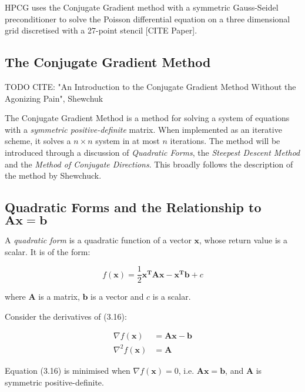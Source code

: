 HPCG uses the Conjugate Gradient method with a symmetric Gauss-Seidel preconditioner to solve the Poisson differential equation on a three dimensional grid discretised with a 27-point stencil [CITE Paper].


%
%
\subsection{The Conjugate Gradient Method}

TODO CITE: "An Introduction to the Conjugate Gradient Method Without the Agonizing Pain", Shewchuk

The Conjugate Gradient Method is a method for solving a system of equations with a \emph{symmetric positive-definite} matrix. When implemented as an iterative scheme, it solves a $n \times n$ system in at most $n$ iterations. The method will be introduced through a discussion of \emph{Quadratic Forms}, the \emph{Steepest Descent Method} and the \emph{Method of Conjugate Directions}. This broadly follows the description of the method by Shewchuck.
 

%
%
\subsection{Quadratic Forms and the Relationship to $\mathbf{A}\mathbf{x}=\mathbf{b}$}

A \emph{quadratic form} is a quadratic function of a vector $\mathbf{x}$, whose return value is a scalar. It is of the form:

\begin{equation}
f(\mathbf{x}) = \frac{1}{2}\mathbf{x}^{\mathbf{T}}\mathbf{A}\mathbf{x} - \mathbf{x}^{\mathbf{T}}\mathbf{b} + c
\end{equation}

where $\mathbf{A}$ is a matrix, $\mathbf{b}$ is a vector and $c$ is a scalar.

Consider the derivatives of (3.16):

\begin{equation}
\begin{split}
\nabla f(\mathbf{x}) &= \mathbf{A}\mathbf{x} - \mathbf{b} \\
\nabla^2 f(\mathbf{x}) &= \mathbf{A}
\end{split}
\end{equation}

Equation (3.16) is minimised when $\nabla f(\mathbf{x}) = 0$, i.e. $\mathbf{A}\mathbf{x} = \mathbf{b}$, and $\mathbf{A}$ is symmetric positive-definite.

